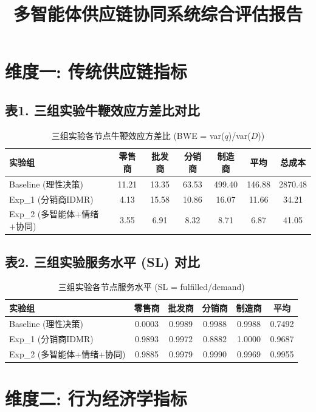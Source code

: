 \documentclass[11pt]{article}
\title{多智能体供应链协同系统综合评估报告}
\author{}
\date{}
\begin{document}
\maketitle

\section*{维度一: 传统供应链指标}

\subsection*{表1. 三组实验牛鞭效应方差比对比}

\begin{table}[h]
\centering
\caption{三组实验各节点牛鞭效应方差比 (BWE = var($q$)/var($D$))}
\label{tab:bwe}
\begin{tabular}{lcccccc}
\toprule
实验组 & 零售商 & 批发商 & 分销商 & 制造商 & 平均 & 总成本 \\
\midrule
Baseline (理性决策) & 11.21 & 13.35 & 63.53 & 499.40 & 146.88 & 2870.48 \\
Exp_1 (分销商IDMR) & 4.13 & 15.58 & 10.86 & 16.07 & 11.66 & 34.21 \\
Exp_2 (多智能体+情绪+协同) & 3.55 & 6.91 & 8.32 & 8.71 & 6.87 & 41.05 \\
\bottomrule
\end{tabular}
\end{table}

\subsection*{表2. 三组实验服务水平 (SL) 对比}

\begin{table}[h]
\centering
\caption{三组实验各节点服务水平 (SL = fulfilled/demand)}
\label{tab:sl}
\begin{tabular}{lccccc}
\toprule
实验组 & 零售商 & 批发商 & 分销商 & 制造商 & 平均 \\
\midrule
Baseline (理性决策) & 0.0003 & 0.9989 & 0.9988 & 0.9988 & 0.7492 \\
Exp_1 (分销商IDMR) & 0.9893 & 0.9972 & 0.8882 & 1.0000 & 0.9687 \\
Exp_2 (多智能体+情绪+协同) & 0.9885 & 0.9979 & 0.9990 & 0.9969 & 0.9955 \\
\bottomrule
\end{tabular}
\end{table}

\section*{维度二: 行为经济学指标}
\end{document}
